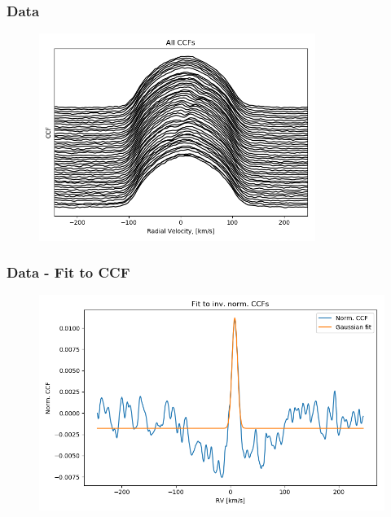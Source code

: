 \documentclass[show notes]{beamer}
\begin{document}
\begin{frame}
\frametitle{Data}
	\begin{figure}
	\centering
	\includegraphics[width=0.8\textwidth]{../figures/All_CCFs.png}
	\label{fig:all_ccfs}
\end{figure}
\end{frame}


\begin{frame}
\frametitle{Data - Fit to CCF}
\begin{figure}
	\centering
	\includegraphics[width=\textwidth]{../figures/fitted_ccf.png}
	\label{fig:fitted_ccf}
\end{figure}
\end{frame}
\end{document}

